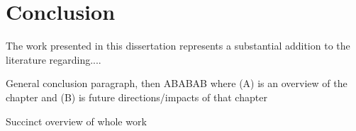 \chapter{Conclusion}

The work presented in this dissertation represents a substantial addition to the literature regarding....

General conclusion paragraph, then ABABAB where (A) is an overview of the chapter and (B) is future directions/impacts of that chapter

Succinct overview of whole work
